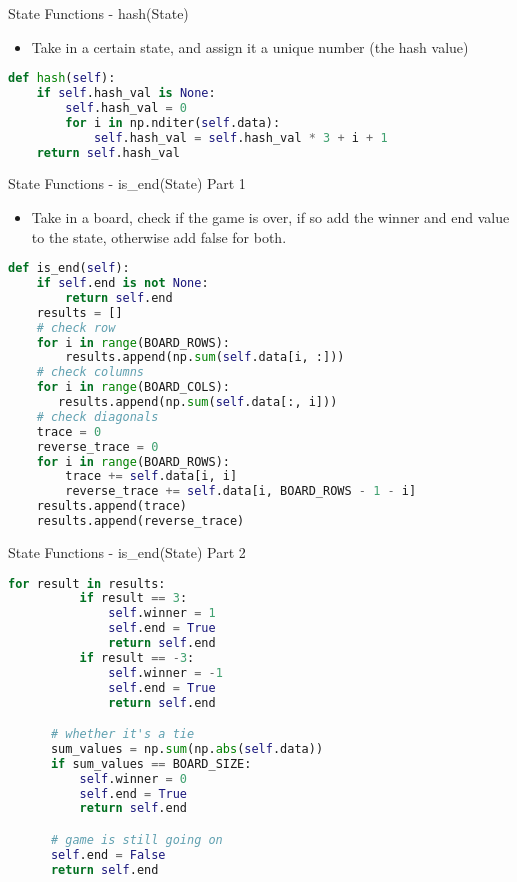\documentclass{beamer}
\begin{document}
    \begin{frame}[fragile]{State Functions - hash(State)}
 		\begin{itemize}
 			\item Take in a certain state, and assign it a unique number (the hash value)
 		\end{itemize}
 		\begin{lstlisting}[language=Python]
def hash(self):
    if self.hash_val is None:
        self.hash_val = 0
        for i in np.nditer(self.data):
            self.hash_val = self.hash_val * 3 + i + 1
    return self.hash_val
\end{lstlisting}
  \end{frame}
  \begin{frame}[fragile]{State Functions - is\_end(State) Part 1}
  \begin{itemize}
  	\item Take in a board, check if the game is over, if so add the winner and end value to the state, otherwise add false for both.
  \end{itemize}
  \begin{lstlisting}[language=Python]
def is_end(self):
    if self.end is not None:
        return self.end
    results = []
    # check row
    for i in range(BOARD_ROWS):
        results.append(np.sum(self.data[i, :]))
    # check columns
    for i in range(BOARD_COLS):
       results.append(np.sum(self.data[:, i]))
    # check diagonals
    trace = 0
    reverse_trace = 0
    for i in range(BOARD_ROWS):
        trace += self.data[i, i]
        reverse_trace += self.data[i, BOARD_ROWS - 1 - i]
    results.append(trace)
    results.append(reverse_trace)
\end{lstlisting}
  	  \end{frame}
  \begin{frame}[fragile]{State Functions - is\_end(State) Part 2}
  \begin{lstlisting}[language=Python]
      for result in results:
          if result == 3:
              self.winner = 1
              self.end = True
              return self.end
          if result == -3:
              self.winner = -1
              self.end = True
              return self.end

      # whether it's a tie
      sum_values = np.sum(np.abs(self.data))
      if sum_values == BOARD_SIZE:
          self.winner = 0
          self.end = True
          return self.end

      # game is still going on
      self.end = False
      return self.end
  \end{lstlisting}
  	  \end{frame}
\end{document}
